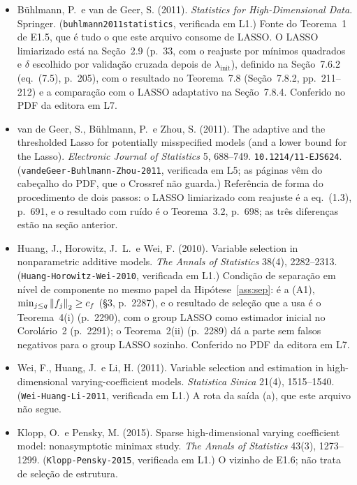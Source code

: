 \documentclass[11pt,a4paper]{article}
\begin{document}
\begin{itemize}[nosep, leftmargin=*]
  \item Bühlmann, P.\ e van de Geer, S. (2011). \emph{Statistics for
    High-Dimensional Data}. Springer. (\texttt{buhlmann2011statistics},
    verificada em L1.) Fonte do Teorema~1 de E1.5, que é tudo o que este
    arquivo consome de LASSO. O LASSO limiarizado está na Seção~2.9
    (p.~33, com o reajuste por mínimos quadrados e $\delta$ escolhido por
    validação cruzada depois de $\lambda_{\mathrm{init}}$), definido na
    Seção~7.6.2 (eq.~(7.5), p.~205), com o resultado no Teorema~7.8
    (Seção~7.8.2, pp.~211--212) e a comparação com o LASSO adaptativo na
    Seção~7.8.4. Conferido no PDF da editora em L7.
  \item van de Geer, S., Bühlmann, P.\ e Zhou, S. (2011). The adaptive and
    the thresholded Lasso for potentially misspecified models (and a lower
    bound for the Lasso). \emph{Electronic Journal of Statistics} 5,
    688--749. \texttt{10.1214/11-EJS624}.
    (\texttt{vandeGeer-Buhlmann-Zhou-2011}, verificada em L5; as páginas vêm
    do cabeçalho do PDF, que o Crossref não guarda.) Referência de forma do
    procedimento de dois passos: o LASSO limiarizado com reajuste é a
    eq.~(1.3), p.~691, e o resultado com ruído é o Teorema~3.2, p.~698; as
    três diferenças estão na seção anterior.
  \item Huang, J., Horowitz, J.~L.\ e Wei, F. (2010). Variable selection in
    nonparametric additive models. \emph{The Annals of Statistics} 38(4),
    2282--2313. (\texttt{Huang-Horowitz-Wei-2010}, verificada em L1.)
    Condição de separação em nível de componente no mesmo papel da
    Hipótese~\ref{ass:sep}: é a (A1), $\min_{j\le q}\left\lVert f_j \right\rVert_2 \ge c_f$
    (§3, p.~2287), e o resultado de seleção que a usa é o Teorema~4(i)
    (p.~2290), com o group LASSO como estimador inicial no Corolário~2
    (p.~2291); o Teorema~2(ii) (p.~2289) dá a parte sem falsos negativos
    para o group LASSO sozinho. Conferido no PDF da editora em L7.
  \item Wei, F., Huang, J.\ e Li, H. (2011). Variable selection and
    estimation in high-dimensional varying-coefficient models.
    \emph{Statistica Sinica} 21(4), 1515--1540.
    (\texttt{Wei-Huang-Li-2011}, verificada em L1.) A rota da saída (a), que
    este arquivo não segue.
  \item Klopp, O.\ e Pensky, M. (2015). Sparse high-dimensional varying
    coefficient model: nonasymptotic minimax study. \emph{The Annals of
    Statistics} 43(3), 1273--1299. (\texttt{Klopp-Pensky-2015}, verificada em
    L1.) O vizinho de E1.6; não trata de seleção de estrutura.
\end{itemize}
\end{document}

